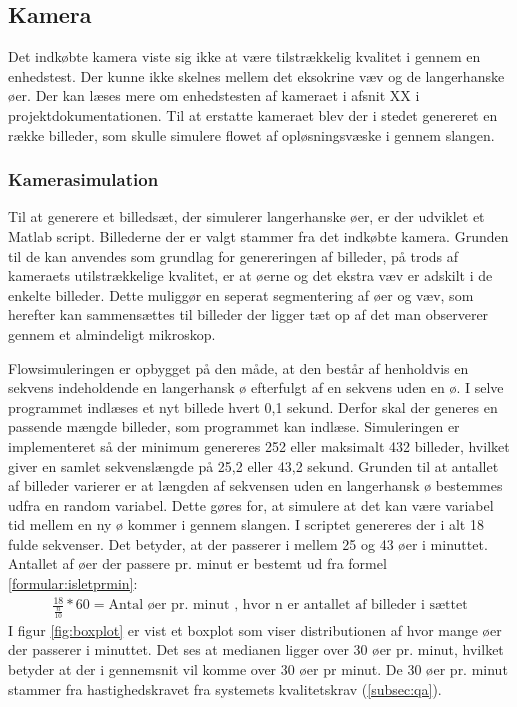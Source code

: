 \subsection{Kamera}
Det indkøbte kamera viste sig ikke at være  tilstrækkelig kvalitet i gennem en enhedstest. Der kunne ikke skelnes mellem det eksokrine væv og de langerhanske øer. Der kan læses mere om enhedstesten af kameraet i afsnit XX i projektdokumentationen. Til at erstatte kameraet blev der i stedet genereret en række billeder, som skulle simulere flowet af opløsningsvæske i gennem slangen. 

\subsubsection{Kamerasimulation}
Til at generere et billedsæt, der simulerer langerhanske øer, er der udviklet et Matlab script. Billederne der er valgt stammer fra det indkøbte kamera. Grunden til de kan anvendes som grundlag for genereringen af billeder, på trods af kameraets utilstrækkelige kvalitet, er at øerne og det ekstra væv er adskilt i de enkelte billeder. Dette muliggør en seperat segmentering af øer og væv, som  herefter kan sammensættes til billeder der ligger tæt op af det man observerer gennem et almindeligt mikroskop. 

Flowsimuleringen er opbygget på den måde, at den består af henholdvis en sekvens indeholdende en langerhansk ø efterfulgt af en sekvens uden en ø. I selve programmet indlæses et nyt billede hvert 0,1 sekund. Derfor skal der generes en passende mængde billeder, som programmet kan indlæse. Simuleringen er implementeret så der minimum genereres 252 eller maksimalt 432 billeder, hvilket giver en samlet sekvenslængde på 25,2 eller 43,2 sekund. Grunden til at antallet af billeder varierer er at længden af sekvensen uden en langerhansk ø bestemmes udfra en random variabel. Dette gøres for, at simulere at det kan være variabel tid mellem en ny ø kommer i gennem slangen. I scriptet genereres der i alt 18 fulde sekvenser. Det betyder, at der passerer i mellem 25 og 43 øer i minuttet. Antallet af øer der passere pr. minut er bestemt ud fra formel \ref{formular:isletprmin}: 
\begin{align}
\frac{18}{\frac{n}{10}} * 60 = \text{Antal øer pr. minut}
\text{ , hvor n er antallet af billeder i sættet}
\label{formular:isletprmin}
\end{align} 
I figur \ref{fig:boxplot} er vist et boxplot som viser distributionen af hvor mange øer der passerer i minuttet. Det ses at medianen ligger over 30 øer pr. minut, hvilket betyder at der i gennemsnit vil komme over 30 øer pr minut. De 30 øer pr. minut stammer fra hastighedskravet fra systemets kvalitetskrav (\ref{subsec:qa}).

